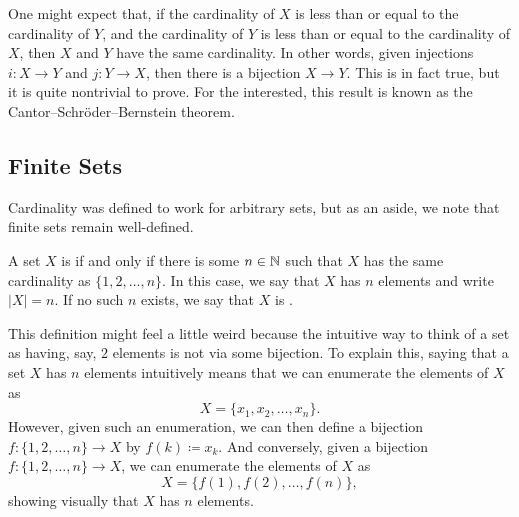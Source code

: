 \documentclass[../notes.tex]{subfiles}
\begin{document}
\begin{remark}
    One might expect that, if the cardinality of $X$ is less than or equal to the cardinality of $Y$, and the cardinality of $Y$ is less than or equal to the cardinality of $X$, then $X$ and $Y$ have the same cardinality. In other words, given injections $i\colon X\to Y$ and $j\colon Y\to X$, then there is a bijection $X\to Y$. This is in fact true, but it is quite nontrivial to prove. For the interested, this result is known as the Cantor--Schröder--Bernstein theorem.
\end{remark}

\subsection{Finite Sets}
Cardinality was defined to work for arbitrary sets, but as an aside, we note that finite sets remain well-defined.
\begin{definition}[finite]
    A set $X$ is  if and only if there is some $n\in\mathbb N$ such that $X$ has the same cardinality as $\{1,2,\ldots,n\}$. In this case, we say that $X$ has $n$ elements and write $|X|=n$. If no such $n$ exists, we say that $X$ is .
\end{definition}
This definition might feel a little weird because the intuitive way to think of a set as having, say, $2$ elements is not via some bijection. To explain this, saying that a set $X$ has $n$ elements intuitively means that we can enumerate the elements of $X$ as
\[X=\{x_1,x_2,\ldots,x_n\}.\]
However, given such an enumeration, we can then define a bijection $f\colon\{1,2,\ldots,n\}\to X$ by $f(k)\coloneqq x_k$. And conversely, given a bijection $f\colon\{1,2,\ldots,n\}\to X$, we can enumerate the elements of $X$ as
\[X=\{f(1),f(2),\ldots,f(n)\},\]
showing visually that $X$ has $n$ elements.

    
\end{document}
